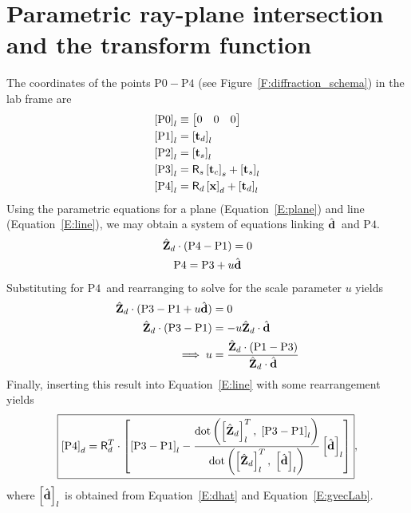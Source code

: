 \documentclass[12pt,letterpaper,final]{amsart}
\newcommand{\mbm}[1]{\ensuremath{\mbox{\boldmath$#1$}}}
\newcommand{\tvecd}{\ensuremath{\mbm{\mathrm{t}}_d}}
\newcommand{\tvecs}{\ensuremath{\mbm{\mathrm{t}}_s}}
\newcommand{\tvecc}{\ensuremath{\mbm{\mathrm{t}}_c}}
\newcommand{\rmatd}{\ensuremath{\mathsf{R}_d}}
\newcommand{\rmats}{\ensuremath{\mathsf{R}_s}}
\newcommand{\dhat}{\ensuremath{\hat{\mbm{\mathrm{d}}}}}
\newcommand{\detpt}{\ensuremath{\mbm{\mathrm{x}}}}
\newcommand{\ghati}{\ensuremath{\hat{G}_{i}}}
\newcommand{\dhati}{\ensuremath{\hat{d}_{i}}}
\newcommand{\ghatj}{\ensuremath{\hat{G}_{j}}}
\newcommand{\bhatj}{\ensuremath{\hat{b}_{j}}}
\newcommand{\Pzero}{\ensuremath{\mathrm{P0}}}
\newcommand{\Pone}{\ensuremath{\mathrm{P1}}}
\newcommand{\Ptwo}{\ensuremath{\mathrm{P2}}}
\newcommand{\Pthree}{\ensuremath{\mathrm{P3}}}
\newcommand{\Pfour}{\ensuremath{\mathrm{P4}}}
\newcommand{\Zl}{\ensuremath{\hat{\mbm{\mathrm{Z}}}_l}}
\newcommand{\Zd}{\ensuremath{\hat{\mbm{\mathrm{Z}}}_d}}
\newcommand{\labcomps}[1]{\left[#1\right]_l}
\newcommand{\detcomps}[1]{\left[#1\right]_d}
\newcommand{\samcomps}[1]{\left[#1\right]_s}
\newcommand{\figref}[1]{Figure~\ref{#1}}
\newcommand{\eqnref}[1]{Equation~\ref{#1}}
\begin{document}
\section{Parametric ray-plane intersection and the transform function}\label{S:transform}
The coordinates of the points $\Pzero-\Pfour$ (see \figref{F:diffraction_schema}) in the lab frame are
\begin{align}
  \labcomps{\Pzero}  &\equiv \begin{bmatrix} 0 & 0 & 0 \end{bmatrix} \\
  \labcomps{\Pone}   &= \labcomps{\tvecd} \\
  \labcomps{\Ptwo}   &= \labcomps{\tvecs} \\
  \labcomps{\Pthree} &= \rmats\samcomps{\tvecc} + \labcomps{\tvecs} \\
  \labcomps{\Pfour}  &= \rmatd\detcomps{\detpt} + \labcomps{\tvecd}
\end{align}
Using the parametric equations for a plane (\eqnref{E:plane}) and line (\eqnref{E:line}), we may obtain a system of equations linking \dhat\ and \Pfour.
\begin{gather}
\Zd \cdot (\Pfour - \Pone) = 0 \label{E:plane}\\
\Pfour = \Pthree + u\dhat \label{E:line}
\end{gather}
Substituting for \Pfour\ and rearranging to solve for the scale parameter $u$ yields
\begin{align}
    \Zd \cdot (\Pthree - \Pone + u\dhat) &= 0 \nonumber\\
    \Zd \cdot (\Pthree - \Pone) &= -u\Zd \cdot \dhat \nonumber\\
    \implies u &= \frac{\Zd \cdot (\Pone - \Pthree)}{\Zd \cdot \dhat
    }
\end{align}
Finally, inserting this result into \eqnref{E:line} with some rearrangement yields
\begin{equation}
  \boxed{\detcomps{\Pfour} = \rmatd^T \cdot \left[ \labcomps{\Pthree - \Pone} 
    - \frac{\mathrm{dot}\left(\labcomps{\Zd}^T,\; \labcomps{\Pthree - \Pone}\right)}
           {\mathrm{dot}\left(\labcomps{\Zd}^T,\; \labcomps{\dhat}\right)}\labcomps{\dhat} \right] }, \label{E:Pfour}
\end{equation}
where $\labcomps{\dhat}$ is obtained from \eqnref{E:dhat} and \eqnref{E:gvecLab}.
\end{document}
